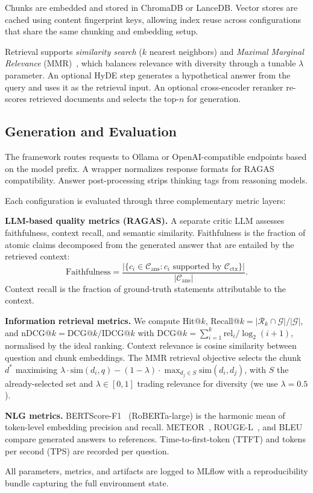 Chunks are embedded and stored in ChromaDB or LanceDB. Vector stores are cached using content fingerprint keys, allowing index reuse across configurations that share the same chunking and embedding setup.

Retrieval supports \emph{similarity search} ($k$ nearest neighbors) and \emph{Maximal Marginal Relevance} (MMR)~\cite{carbonell1998mmr}, which balances relevance with diversity through a tunable $\lambda$ parameter. An optional HyDE step generates a hypothetical answer from the query and uses it as the retrieval input. An optional cross-encoder reranker re-scores retrieved documents and selects the top-$n$ for generation.

\subsection{Generation and Evaluation}

The framework routes requests to Ollama or OpenAI-compatible endpoints based on the model prefix. A wrapper normalizes response formats for RAGAS compatibility. Answer post-processing strips thinking tags from reasoning models.

Each configuration is evaluated through three complementary metric layers:

\textbf{LLM-based quality metrics (RAGAS).} A separate critic LLM assesses faithfulness, context recall, and semantic similarity. Faithfulness is the fraction of atomic claims decomposed from the generated answer that are entailed by the retrieved context:
\begin{equation}
\text{Faithfulness} = \frac{|\{c_i \in \mathcal{C}_{\text{ans}} : c_i \text{ supported by } \mathcal{C}_{\text{ctx}}\}|}{|\mathcal{C}_{\text{ans}}|}.
\end{equation}
Context recall is the fraction of ground-truth statements attributable to the context.

\textbf{Information retrieval metrics.} We compute Hit@$k$, Recall@$k = |\mathcal{R}_k \cap \mathcal{G}|/|\mathcal{G}|$, and nDCG@$k = \text{DCG}@k/\text{IDCG}@k$ with $\text{DCG}@k = \sum_{i=1}^{k} \text{rel}_i / \log_2(i+1)$, normalised by the ideal ranking. Context relevance is cosine similarity between question and chunk embeddings. The MMR retrieval objective selects the chunk $d^*$ maximising $\lambda \cdot \text{sim}(d_i, q) - (1-\lambda) \cdot \max_{d_j \in S} \text{sim}(d_i, d_j)$, with $S$ the already-selected set and $\lambda \in [0,1]$ trading relevance for diversity (we use $\lambda = 0.5$).

\textbf{NLG metrics.} BERTScore-F1~\cite{zhang2020bertscore} (RoBERTa-large) is the harmonic mean of token-level embedding precision and recall. METEOR~\cite{banerjee2005meteor}, ROUGE-L~\cite{lin2004rouge}, and BLEU~\cite{papineni2002bleu} compare generated answers to references. Time-to-first-token (TTFT) and tokens per second (TPS) are recorded per question.

All parameters, metrics, and artifacts are logged to MLflow with a reproducibility bundle capturing the full environment state.
